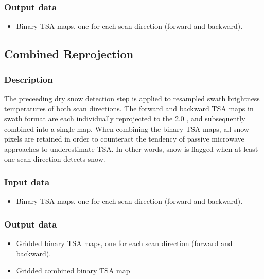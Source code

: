 \documentclass[letterpaper,10pt,english]{jupyterBook}
\begin{document}
\subsubsection{Output data}
\label{\detokenize{book/baseline_algorithm_definition:output-data}}\begin{itemize}
\item {} 
\sphinxAtStartPar
Binary TSA maps, one for each scan direction (forward and backward).

\end{itemize}


\subsection{Combined Reprojection}
\label{\detokenize{book/baseline_algorithm_definition:combined-reprojection}}

\subsubsection{Description}
\label{\detokenize{book/baseline_algorithm_definition:description}}
\sphinxAtStartPar
The preceeding dry snow detection step is applied to resampled swath brightness temperatures of both scan directions.
The forward and backward TSA maps in swath format are each individually reprojected to the {\hyperref[\detokenize{book/acronyms:term-EASE-Grid}]{}} 2.0 {\hyperref[\detokenize{book/acronyms:term-NH}]{}}, and subsequently combined into a single map.
When combining the binary TSA maps, all snow pixels are retained in order to counteract the tendency of passive microwave approaches to underestimate TSA.
In other words, snow is flagged when at least one scan direction detects snow.


\subsubsection{Input data}
\label{\detokenize{book/baseline_algorithm_definition:id7}}\begin{itemize}
\item {} 
\sphinxAtStartPar
Binary TSA maps, one for each scan direction (forward and backward).

\end{itemize}


\subsubsection{Output data}
\label{\detokenize{book/baseline_algorithm_definition:id8}}\begin{itemize}
\item {} 
\sphinxAtStartPar
Gridded binary TSA maps, one for each scan direction (forward and backward).

\item {} 
\sphinxAtStartPar
Gridded combined binary TSA map

\end{itemize}
\end{document}
